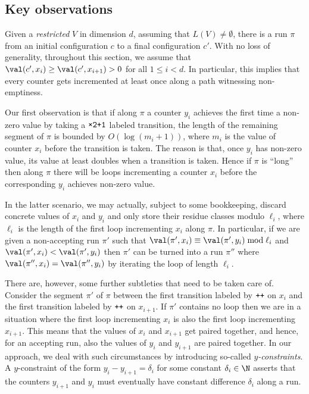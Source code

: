 
\subsection{Key observations}

Given a \emph{restricted} \laVASS $V$ in dimension $d$, assuming that
$L(V)\neq \emptyset$, there is a run $\pi$ from an initial
configuration $c$ to a final configuration $c'$. With no loss of
generality, throughout this section, we assume that $\val(c',x_i) \ge
\val(c',x_{i+1})>0$ for all $1\le i<d$. In particular, this implies
that every counter gets incremented at least once along a path
witnessing non-emptiness.

Our first observation is that if along $\pi$ a counter $y_i$ achieves
the first time a non-zero value by taking a $\wTTPO$ labeled
transition, the length of the remaining segment of $\pi$ is bounded by
$O(\log(m_i+1))$, where $m_i$ is the value of counter $x_i$ before the
transition is taken. The reason is that, once $y_i$ has non-zero
value, its value at least doubles when a transition is taken. Hence if
$\pi$ is ``long'' then along $\pi$ there will be loops incrementing a
counter $x_i$ before the corresponding $y_i$ achieves non-zero value.

In the latter scenario, we may actually, subject to some bookkeeping,
discard concrete values of $x_i$ and $y_i$ and only store their
residue classes modulo $\ell_i$, where $\ell_i$ is the length of the
first loop incrementing $x_i$ along $\pi$. In particular, if we are
given a non-accepting run $\pi'$ such that $\val(\pi',x_i) \equiv
\val(\pi',y_i) \bmod \ell_i$ and $\val(\pi',x_i)<\val(\pi',y_i)$ then
$\pi'$ can be turned into a run $\pi''$ where $\val(\pi'',x_i) =
\val(\pi'',y_i)$ by iterating the loop of length $\ell_i$.

There are, however, some further subtleties that need to be taken care
of. Consider the segment $\pi'$ of $\pi$ between the first transition
labeled by ${\normalfont{\texttt{{++}}}}$ on $x_i$ and the first transition labeled by ${\normalfont{\texttt{{++}}}}$ on
$x_{i+1}$. If $\pi'$ contains no loop then we are in a situation where
the first loop incrementing $x_i$ is also the first loop incrementing
$x_{i+1}$. This means that the values of $x_i$ and $x_{i+1}$ get
paired together, and hence, for an accepting run, also the values of
$y_i$ and $y_{i+1}$ are paired together. In our approach, we deal with
such circumstances by introducing so-called \emph{$y$-constraints}. A
$y$-constraint of the form $y_i-y_{i+1}=\delta_i$ for some constant
$\delta_i \in \N$ asserts that the counters $y_{i+1}$ and $y_i$ must
eventually have constant difference $\delta_i$ along a run.

